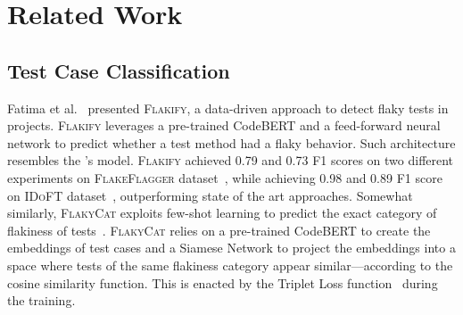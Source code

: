 \section{Related Work}
\label{sec:rw}

\subsection{Test Case Classification}

Fatima et al.~\cite{fatima:tse2023:flakify} presented \textsc{Flakify}, a data-driven approach to detect flaky tests in \Java projects.
\textsc{Flakify} leverages a pre-trained CodeBERT and a feed-forward neural network %
to predict whether a \JUnit test method had a flaky behavior.
Such architecture resembles the \vuteco's \finder model.
\textsc{Flakify} achieved 0.79 and 0.73 F1 scores on two different experiments on \textsc{FlakeFlagger} dataset~\cite{Alshammari:icse2021:FlakeFlagger}, while achieving 0.98 and 0.89 F1 score on \textsc{IDoFT} dataset~\cite{lam:icst2019:idflakies}, outperforming state of the art approaches.
Somewhat similarly, \textsc{FlakyCat} exploits few-shot learning to predict the exact category of flakiness of \JUnit tests~\cite{akli:ast2023:flakycat}.
\textsc{FlakyCat} relies on a pre-trained CodeBERT to create the embeddings of test cases and a Siamese Network to project the embeddings into a space where tests of the same flakiness category appear similar---according to the cosine similarity function.
This is enacted by the Triplet Loss function~\cite{Schroff2015:triplet:loss} during the training.


